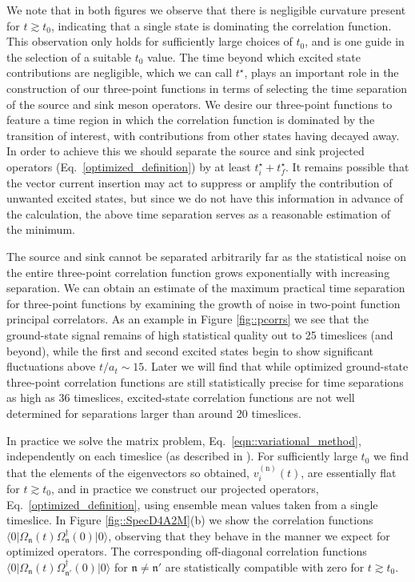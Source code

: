 \documentclass[twocolumn,amsmath,amssymb,prd,10pt,floatfix, 
superscriptaddress,nofootinbib, showpacs, preprintnumbers]{revtex4-1}
\begin{document}
We note that in both figures we observe that there is negligible curvature present for $t \gtrsim t_0$, indicating that a single state is dominating the correlation function. This observation only holds for sufficiently large choices of $t_0$, and is one guide in the selection of a suitable $t_0$ value. The time beyond which excited state contributions are negligible, which we can call $t^\star$, plays an important role in the construction of our three-point functions in terms of selecting the time separation of the source and sink meson operators. We desire our three-point functions to feature a time region in which the correlation function is dominated by the transition of interest, with contributions from other states having decayed away. In order to achieve this we should separate the source and sink projected operators (Eq.~\ref{optimized_definition}) by at least $t^\star_i + t^\star_f$. It remains possible that the vector current insertion may act to suppress or amplify the contribution of unwanted excited states, but since we do not have this information in advance of the calculation, the above time separation serves as a reasonable estimation of the minimum. 

The source and sink cannot be separated arbitrarily far as the statistical noise on the entire three-point correlation function grows exponentially with increasing separation. We can obtain an estimate of the maximum practical time separation for three-point functions by examining the growth of noise in two-point function principal correlators. As an example in Figure \ref{fig::pcorrs} we see that the ground-state signal remains of high statistical quality out to 25 timeslices (and beyond), while the first and second excited states begin to show significant fluctuations above $t/a_t \sim 15$. Later we will find that while optimized ground-state three-point correlation functions are still statistically precise for time separations as high as 36 timeslices, excited-state correlation functions are not well determined for separations larger than around 20 timeslices.


In practice we solve the matrix problem, Eq.~\ref{eqn::variational_method}, independently on each timeslice (as described in \cite{Dudek:2010wm}). For sufficiently large $t_0$ we find that the elements of the eigenvectors so obtained, $v^{(\mathrm{n})}_i(t)$, are essentially flat for $t \gtrsim t_0$, and in practice we construct our projected operators, Eq.~\ref{optimized_definition}, using ensemble mean values taken from a single timeslice. In Figure \ref{fig::SpecD4A2M}(b) we show the correlation functions $\big\langle 0 \big| \Omega_\mathfrak{n}(t) \Omega^\dag_\mathfrak{n}(0) \big| 0 \big\rangle$, observing that they behave in the manner we expect for optimized operators. The corresponding off-diagonal correlation functions $\big\langle 0 \big| \Omega_\mathfrak{n}(t) \Omega^\dag_\mathfrak{n'}(0) \big| 0 \big\rangle$ for $\mathfrak{n} \neq \mathfrak{n'}$ are statistically compatible with zero for $t \gtrsim t_0$. 
\end{document}
